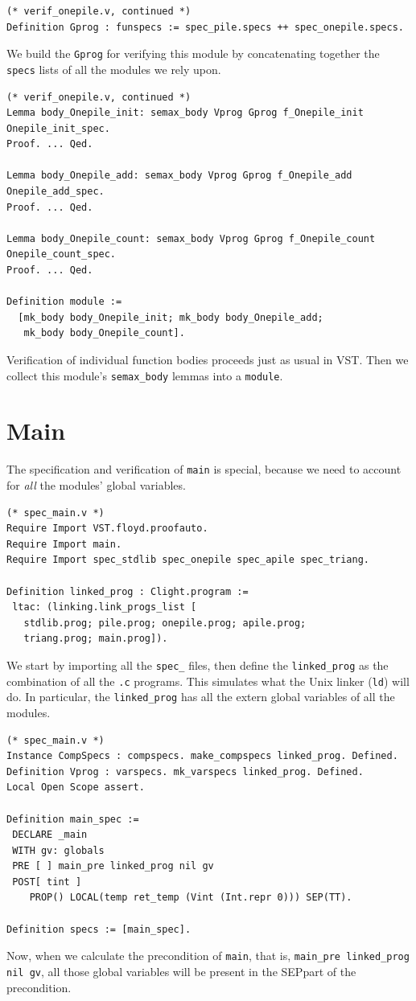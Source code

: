 \documentclass[runningheads,orivec]{llncs}
\newcommand{\SEP}{\mbox{\small SEP}}
\begin{document}
\begin{lstlisting}
(* verif_onepile.v, continued *)
Definition Gprog : funspecs := spec_pile.specs ++ spec_onepile.specs.
\end{lstlisting}
We build the \lstinline{Gprog} for verifying this module by
concatenating together the \lstinline{specs} lists of all
the modules we rely upon.

\begin{lstlisting}
(* verif_onepile.v, continued *)
Lemma body_Onepile_init: semax_body Vprog Gprog f_Onepile_init Onepile_init_spec.
Proof. ... Qed.

Lemma body_Onepile_add: semax_body Vprog Gprog f_Onepile_add Onepile_add_spec.
Proof. ... Qed.

Lemma body_Onepile_count: semax_body Vprog Gprog f_Onepile_count Onepile_count_spec.
Proof. ... Qed.

Definition module := 
  [mk_body body_Onepile_init; mk_body body_Onepile_add; 
   mk_body body_Onepile_count].
\end{lstlisting}
Verification of individual function bodies proceeds just as
usual in VST.  Then we collect this module's \lstinline{semax_body}
lemmas into a \lstinline{module}.

\section{Main}
The specification and verification of \lstinline{main} is
special, because we need to account for \emph{all} the modules'
global variables.

\begin{lstlisting}
(* spec_main.v *)
Require Import VST.floyd.proofauto.
Require Import main.
Require Import spec_stdlib spec_onepile spec_apile spec_triang.

Definition linked_prog : Clight.program :=
 ltac: (linking.link_progs_list [
   stdlib.prog; pile.prog; onepile.prog; apile.prog;
   triang.prog; main.prog]).
\end{lstlisting}  
We start by importing all the \lstinline{spec_} files,
then define the \lstinline{linked_prog} as
the combination of all the \lstinline{.c} programs.
This simulates what the Unix linker (\lstinline{ld})
will do.  In particular, the \lstinline{linked_prog}
has all the extern global variables of all the modules.

\begin{lstlisting}
(* spec_main.v *)
Instance CompSpecs : compspecs. make_compspecs linked_prog. Defined.
Definition Vprog : varspecs. mk_varspecs linked_prog. Defined.
Local Open Scope assert.

Definition main_spec :=
 DECLARE _main
 WITH gv: globals
 PRE [ ] main_pre linked_prog nil gv
 POST[ tint ]
    PROP() LOCAL(temp ret_temp (Vint (Int.repr 0))) SEP(TT).

Definition specs := [main_spec].
\end{lstlisting}  
Now, when we calculate the precondition of \lstinline{main},
that is, \lstinline{main_pre linked_prog nil gv},
all those global variables will be present in the
\SEP part of the precondition.
\end{document}
